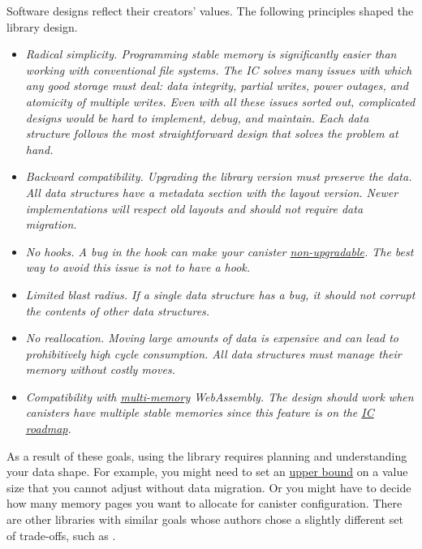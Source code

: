 \documentclass{article}
\begin{document}
Software designs reflect their creators' values.
The following principles shaped the  library design.
\begin{itemize}
  \item
    \label{radical-simplicity}
    \em{Radical simplicity.}
    Programming stable memory is significantly easier than working with conventional file systems.
    The IC solves many issues with which any good storage must deal: data integrity, partial writes, power outages, and atomicity of multiple writes.
    Even with all these issues sorted out, complicated designs would be hard to implement, debug, and maintain.
    Each data structure follows the most straightforward design that solves the problem at hand.
  \item
    \label{backward-compatibility}
    \em{Backward compatibility.}
    Upgrading the library version must preserve the data.
    All data structures have a metadata section with the layout version.
    Newer implementations will respect old layouts and should not require data migration.
  \item
    \em{No  hooks.}
    A bug in the  hook can make your canister \href{/posts/01-effective-rust-canisters.html#upgrade-hook-panics}{non-upgradable}.
    The best way to avoid this issue is not to have a  hook.
  \item
    \em{Limited blast radius.}
    If a single data structure has a bug, it should not corrupt the contents of other data structures.
  \item
    \em{No reallocation.}
    Moving large amounts of data is expensive and can lead to prohibitively high cycle consumption.
    All data structures must manage their memory without costly moves.
  \item
    \em{Compatibility with \href{https://github.com/WebAssembly/multi-memory/blob/master/proposals/multi-memory/Overview.md}{multi-memory} WebAssembly.}
    The design should work when canisters have multiple stable memories since this feature is on the \href{https://forum.dfinity.org/t/proposal-wasm-native-stable-memory/15966#proposal-7}{IC roadmap}.
\end{itemize}

As a result of these goals, using the library requires planning and understanding your data shape.
For example, you might need to set an \href{#max-size-attribute}{upper bound} on a value size that you cannot adjust without data migration.
Or you might have to decide how many memory pages you want to allocate for canister configuration.
There are other libraries with similar goals whose authors chose a slightly different set of trade-offs, such as \href{https://crates.io/crates/ic-stable-memory}{}.
\end{document}
